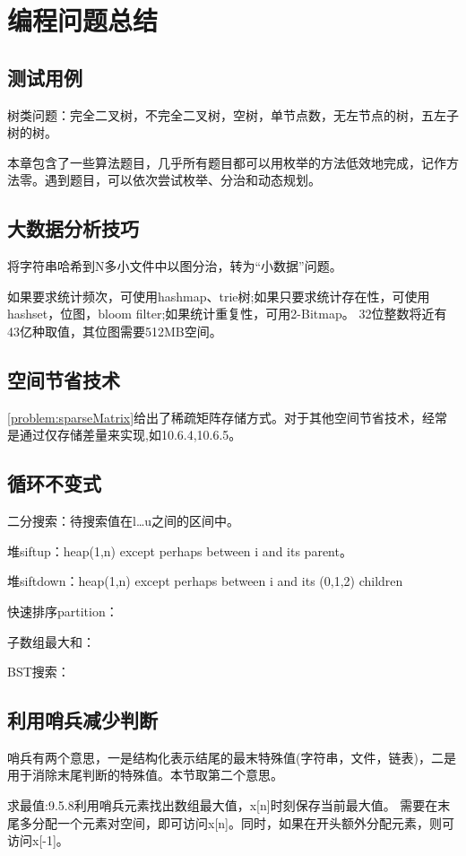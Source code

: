

\section{编程问题总结}
\subsection{测试用例}
树类问题：完全二叉树，不完全二叉树，空树，单节点数，无左节点的树，五左子树的树。

本章包含了一些算法题目，几乎所有题目都可以用枚举的方法低效地完成，记作方法零。遇到题目，可以依次尝试枚举、分治和动态规划。

\subsection{大数据分析技巧}
将字符串哈希到N多小文件中以图分治，转为“小数据”问题。

如果要求统计频次，可使用hashmap、trie树;如果只要求统计存在性，可使用hashset，位图，bloom filter;如果统计重复性，可用2-Bitmap。
32位整数将近有43亿种取值，其位图需要512MB空间。


\subsection{空间节省技术}
\ref{problem:sparseMatrix}给出了稀疏矩阵存储方式。对于其他空间节省技术，经常是通过仅存储差量来实现,如\cite{pp}10.6.4,10.6.5。

\subsection{循环不变式}
二分搜索：待搜索值在l\dots u之间的区间中。

堆siftup：heap(1,n) except perhaps between i and its parent。

堆siftdown：heap(1,n) except perhaps between i and its (0,1,2) children

快速排序partition：

子数组最大和：

BST搜索：

\subsection{利用哨兵减少判断}
哨兵有两个意思\cite{wikipedia}，一是结构化表示结尾的最末特殊值(字符串，文件，链表)，二是用于消除末尾判断的特殊值。本节取第二个意思。

求最值:\cite{pp}9.5.8利用哨兵元素找出数组最大值，x[n]时刻保存当前最大值。 需要在末尾多分配一个元素对空间，即可访问x[n]。同时，如果在开头额外分配元素，则可访问x[-1]。


